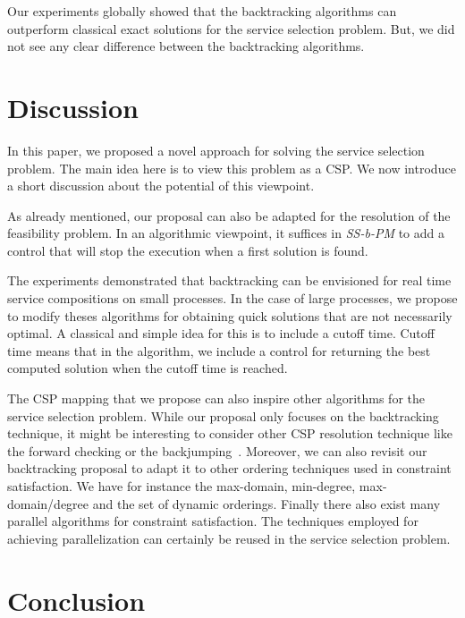 \documentclass[a4paper]{article}
\begin{document}
Our experiments globally showed that the backtracking algorithms can outperform classical 
exact solutions for the service selection problem. But, we did not see any clear 
difference between the backtracking algorithms. 


\section{Discussion} \label{Discussion}

In this paper, we proposed a novel approach for solving the service selection problem. 
The main idea here is to view this problem as a CSP. We now introduce a short discussion 
about the potential of this viewpoint. 


As already mentioned, our proposal can also be adapted for the resolution of the 
feasibility problem. In an algorithmic viewpoint, it suffices in {\it SS-b-PM} to add 
a control that will stop the execution when a first solution is found. 

The experiments demonstrated that 
backtracking can be envisioned for real time service compositions on small processes. 
In the case of large processes, we propose to modify theses algorithms for obtaining quick solutions  
that are not necessarily optimal. A classical and simple idea for this is 
to include a cutoff time. Cutoff time means that in the algorithm, we include a control for returning 
the best computed solution when the cutoff time is reached. 

The CSP mapping that we propose can also inspire other algorithms for the service 
selection problem. While our proposal only focuses on the backtracking technique, it might
be interesting to consider other CSP resolution technique like the forward checking or the 
backjumping~\cite{Baker95intelligentbacktracking}. Moreover, we can also revisit our 
backtracking proposal to adapt it to other ordering techniques used in constraint 
satisfaction. We have for instance the max-domain, min-degree, max-domain/degree and 
the set of dynamic orderings. Finally there also exist many parallel algorithms for 
constraint satisfaction. The techniques employed for achieving parallelization can certainly 
be reused in the service selection problem.


\section{Conclusion} \label{Conclusion}
\end{document}
